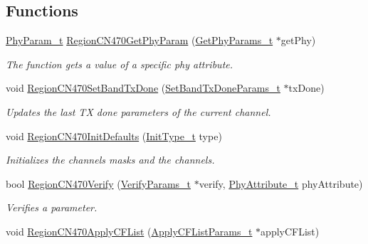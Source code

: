 \subsection*{Functions}
\begin{DoxyCompactItemize}
\item 
\hyperlink{group__REGION_gaed159b26e5c4677236b6e8677019db30}{Phy\+Param\+\_\+t} \hyperlink{group__REGIONCN470_gaa3f4e59184226b161b9e6880b6e7f204}{Region\+C\+N470\+Get\+Phy\+Param} (\hyperlink{group__REGION_gab471483fff904f4f89bbc03f7fc380ab}{Get\+Phy\+Params\+\_\+t} $\ast$get\+Phy)
\begin{DoxyCompactList}\small\item\em The function gets a value of a specific phy attribute. \end{DoxyCompactList}\item 
void \hyperlink{group__REGIONCN470_gad60aebff1bb6c89423fff84d57b21cb6}{Region\+C\+N470\+Set\+Band\+Tx\+Done} (\hyperlink{group__REGION_gad0524aa0673c0814a71e7a4f9cade3fc}{Set\+Band\+Tx\+Done\+Params\+\_\+t} $\ast$tx\+Done)
\begin{DoxyCompactList}\small\item\em Updates the last TX done parameters of the current channel. \end{DoxyCompactList}\item 
void \hyperlink{group__REGIONCN470_ga6591ac8edd635c34b47ec2f21627b145}{Region\+C\+N470\+Init\+Defaults} (\hyperlink{group__REGION_gaddc73ae10673ec925724e7870363bda9}{Init\+Type\+\_\+t} type)
\begin{DoxyCompactList}\small\item\em Initializes the channels masks and the channels. \end{DoxyCompactList}\item 
bool \hyperlink{group__REGIONCN470_ga7d7ddf394ddb8a6ac2d7cb5fea7ad745}{Region\+C\+N470\+Verify} (\hyperlink{group__REGION_ga966d97bc2f25df1c09e92e60ef652276}{Verify\+Params\+\_\+t} $\ast$verify, \hyperlink{group__REGION_ga9445b07fdf77581ecfaf389970e635f8}{Phy\+Attribute\+\_\+t} phy\+Attribute)
\begin{DoxyCompactList}\small\item\em Verifies a parameter. \end{DoxyCompactList}\item 
void \hyperlink{group__REGIONCN470_gae0ca4a5d6bf63fdb278a132ec496649f}{Region\+C\+N470\+Apply\+C\+F\+List} (\hyperlink{group__REGION_ga71588e9ad07e34b78fa91d51881fd3c6}{Apply\+C\+F\+List\+Params\+\_\+t} $\ast$apply\+C\+F\+List)

\end{DoxyCompactItemize}
